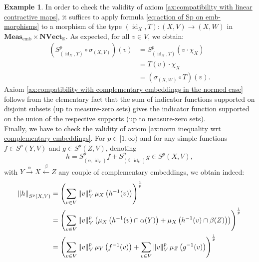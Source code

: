 \documentclass{amsart}
\theoremstyle{definition}
\newtheorem{example}[definition]{Example}
\theoremstyle{plain}
\newcommand{\norm}[1]{\left\lVert #1\right\rVert} %
\newcommand{\id}{\operatorname{id}}
\newcommand{\embMeas}{\mathbf{Meas}_\mathrm{emb}}
\newcommand{\NVect}{\mathbf{NVect}_{\mathbb{K}}}
\begin{document}
\begin{example}
            In order to check the validity of axiom \ref{ax:compatibility with linear contractive maps}, it suffices to apply formula \eqref{eq:action of Sp on emb-morphisms} to a morphism of the type $(\id_X,T) \colon (X,V) \rightarrow (X,W)$ in $\embMeas \times \NVect$. As expected, for all $v \in V$, we obtain:
            \begin{equation*}
                \begin{split}
                    \left( S^p_{(\id_X,T)} \circ \sigma_{(X,V)} \right)(v) &= S^p_{(\id_X,T)}(v \cdot \chi_X) \\
                    &= T(v) \cdot \chi_X \\
                    &= \left( \sigma_{(X,W)} \circ T \right)(v). 
                \end{split}
            \end{equation*}
            Axiom \ref{ax:compatibility with complementary embeddings in the normed case} follows from the elementary fact that the sum of indicator functions supported on disjoint subsets (up to measure-zero sets) gives the indicator function supported on the union of the respective supports (up to measure-zero sets). \\
            Finally, we have to check the validity of axiom \ref{ax:norm inequality wrt complementary embeddings}.
            For $p \in [1,\infty)$ and for any simple functions $f \in S^p{(Y,V)}$ and $g \in S^p{(Z,V)}$, denoting 
            \begin{equation*}
                h = S^p_{(\alpha,\id_V)}f + S^p_{(\beta,\id_V)}g \in S^p{(X,V)},
            \end{equation*}
            with $Y \xrightarrow{~\alpha~} X \xleftarrow{~\beta~} Z$ any couple of complementary embeddings, we obtain indeed:
            \begin{align}
                \norm{h}_{S^p(X,V)} &= \left( \sum_{v \in V} \norm{v}_V^p \mu_{X}\left( h^{-1}(v) \right) \right)^{\frac{1}{p}} \notag \\
                &= \left( \sum_{v \in V} \norm{v}_V^p \left( \mu_{X}\left( h^{-1}(v) \cap \alpha(Y) \right) + \mu_{X}\left( h^{-1}(v) \cap \beta(Z) \right) \right) \right)^{\frac{1}{p}} \label{eq:complementary embeddings and additivity of mu} \\
                &= \left( \sum_{v \in V} \norm{v}_V^p \mu_{Y}\left( f^{-1}(v) \right) + \sum_{v \in V} \norm{v}_V^p \mu_{Z}\left( g^{-1}(v) \right) \right)^{\frac{1}{p}} \label{eq:h coincides with f on Y and with g on Z} \\

\end{align}
\end{example}
\end{document}

